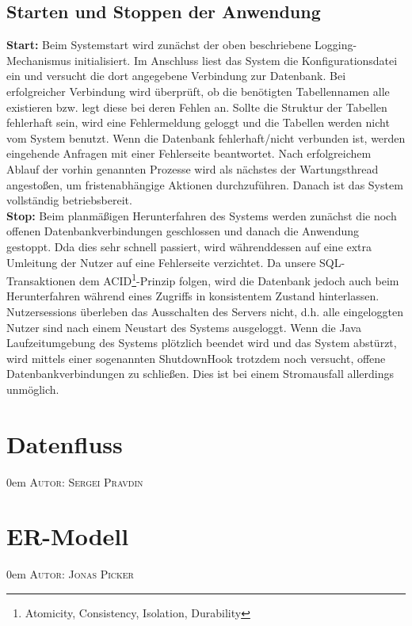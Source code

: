 \documentclass{article}
\makeatletter
\newcommand{\sectionauthor}[1]{
	{\parindent 0em \large \scshape Autor: #1 \par \nobreak \vspace*{1em}}
	\@afterheading
}
\makeatother
\begin{document}
\subsection{Starten und Stoppen der Anwendung}
\noindent \textbf{Start:} Beim Systemstart wird zunächst der oben beschriebene Logging-Mechanismus initialisiert. Im Anschluss liest das System die Konfigurationsdatei ein und versucht die dort angegebene Verbindung zur Datenbank. Bei erfolgreicher Verbindung wird überprüft, ob die benötigten Tabellennamen alle existieren bzw. legt diese bei deren Fehlen an. Sollte die Struktur der Tabellen fehlerhaft sein, wird eine Fehlermeldung geloggt und die Tabellen werden nicht vom System benutzt. Wenn die Datenbank fehlerhaft/nicht verbunden ist, werden eingehende Anfragen mit einer Fehlerseite beantwortet. Nach erfolgreichem Ablauf der vorhin genannten Prozesse wird als nächstes der Wartungsthread angestoßen, um fristenabhängige Aktionen durchzuführen. Danach ist das System vollständig betriebsbereit.\\
\textbf{Stop:} 
Beim planmäßigen Herunterfahren des Systems werden zunächst die noch offenen Datenbankverbindungen geschlossen und danach die Anwendung gestoppt. Dda dies sehr schnell passiert, wird währenddessen auf eine extra Umleitung der Nutzer auf eine Fehlerseite verzichtet. Da unsere SQL-Transaktionen dem ACID\footnote{Atomicity, Consistency, Isolation, Durability}-Prinzip folgen, wird die Datenbank jedoch auch beim Herunterfahren während eines Zugriffs in konsistentem Zustand hinterlassen. Nutzersessions überleben das Ausschalten des Servers nicht, d.h. alle eingeloggten Nutzer sind nach einem Neustart des Systems ausgeloggt. Wenn die Java Laufzeitumgebung des Systems plötzlich beendet wird und das System abstürzt, wird mittels einer sogenannten ShutdownHook trotzdem noch versucht, offene Datenbankverbindungen zu schließen. Dies ist bei einem Stromausfall allerdings unmöglich. 
\section{Datenfluss}
\sectionauthor{Sergei Pravdin}

\section{ER-Modell}
\sectionauthor{Jonas Picker}
\end{document}
